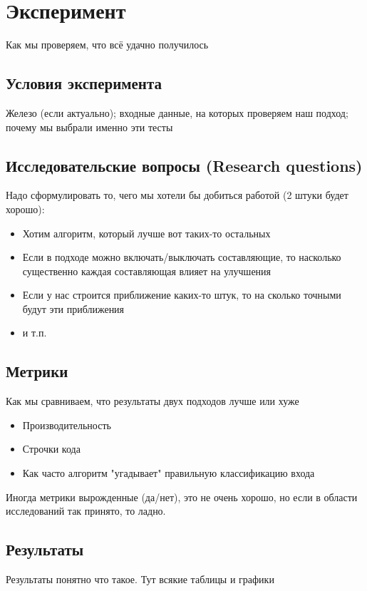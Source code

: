\section{Эксперимент}
Как мы проверяем, что  всё удачно получилось

\subsection{Условия эксперимента}
Железо (если актуально); входные данные, на которых проверяем наш подход; почему мы выбрали именно эти тесты

\subsection{Исследовательские вопросы (Research questions)}
Надо сформулировать то, чего мы хотели бы добиться работой (2 штуки будет хорошо):

\begin{itemize}
\item Хотим алгоритм, который лучше вот таких-то остальных
\item Если в подходе можно включать/выключать составляющие, то насколько существенно каждая составляющая влияет на улучшения
\item Если у нас строится приближение каких-то штук, то на сколько точными будут эти приближения
\item и т.п.
\end{itemize}

\subsection{Метрики}

Как мы сравниваем, что результаты двух подходов лучше или хуже
\begin{itemize}
\item Производительность
\item Строчки кода
\item Как часто алгоритм "угадывает" правильную классификацию входа
\end{itemize}

Иногда метрики вырожденные (да/нет), это не очень хорошо, но если в области исследований так принято, то ладно.

\subsection{Результаты}
Результаты понятно что такое. Тут всякие таблицы и графики

